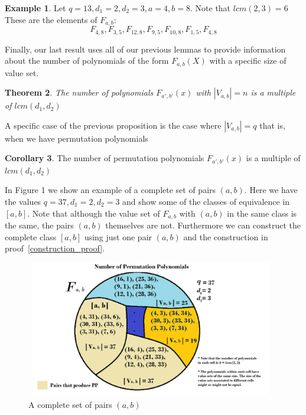 \documentclass{article}
\newtheorem{theorem}{Theorem}[section]
\theoremstyle{definition}
\newtheorem{corollary}[theorem]{Corollary}
\newtheorem{example}[theorem]{Example}
\theoremstyle{remark}
\numberwithin{equation}{section}
\begin{document}
 \begin{example}
    Let $q = 13, d_1 = 2, d_2 = 3, a = 4, b = 8$. Note that $lcm(2,3) = 6$ These are the elements of $F_{a,b}$:
    $$ F_{4, 8}, F_{3, 5}, F_{12, 8}, F_{9, 5}, F_{10, 8}, F_{1, 5}, F_{4,8} $$
  \end{example}

Finally, our last result uses all of our previous lemmas to provide information about the number of polynomials of the form $F_{a,b}(X)$ with a specific size of value set.

\begin{theorem}

  The number of polynomials $F_{a', b'}(x)$ with $|V_{a, b}| = n$ is a multiple of $lcm(d_1,d_2)$

\end{theorem}
    
A specific case of the previous proposition is the case where $|V_{a, b}| = q$ that is, when we have permutation polynomials

\begin{corollary}
  The number of permutation polynomials $F_{a', b'}(x)$ is a multiple of $lcm(d_1,d_2)$  
\end{corollary}

In Figure 1 we show an example of a complete set of pairs $(a,b)$. Here we have the values $q=37, d_1=2, d_2=3$ and show some of the classes of equivalence in $[a,b]$. Note that although the value set of $F_{a,b}$ with $(a,b)$ in the same class is the same, the pairs $(a,b)$ themselves are not. Furthermore we can construct the complete class $[a,b]$ using just one pair $(a,b)$ and the construction in proof~\ref{construction_proof}.

\begin{figure}
  \includegraphics[width=11cm, height=6cm]{clases}
  \caption{A complete set of pairs $(a,b)$}
\end{figure}
\end{document}
